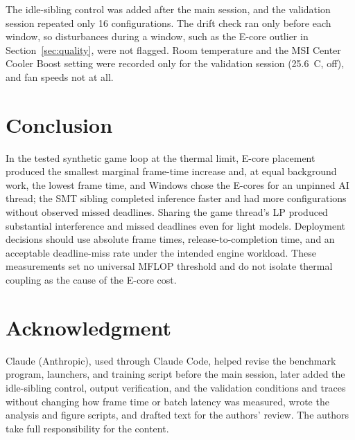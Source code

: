 \documentclass[conference]{IEEEtran}
\begin{document}
The idle-sibling control was added after the main session, and the validation session repeated only 16 configurations. The drift check ran only before each window, so disturbances during a window, such as the E-core outlier in Section~\ref{sec:quality}, were not flagged. Room temperature and the MSI Center Cooler Boost setting were recorded only for the validation session (25.6~\textdegree C, off), and fan speeds not at all.

\section{Conclusion}
In the tested synthetic game loop at the thermal limit, E-core placement produced the smallest marginal frame-time increase and, at equal background work, the lowest frame time, and Windows chose the E-cores for an unpinned AI thread; the SMT sibling completed inference faster and had more configurations without observed missed deadlines. Sharing the game thread's LP produced substantial interference and missed deadlines even for light models. Deployment decisions should use absolute frame times, release-to-completion time, and an acceptable deadline-miss rate under the intended engine workload. These measurements set no universal MFLOP threshold and do not isolate thermal coupling as the cause of the E-core cost.

\section*{Acknowledgment}
Claude (Anthropic), used through Claude Code, helped revise the benchmark program, launchers, and training script before the main session, later added the idle-sibling control, output verification, and the validation conditions and traces without changing how frame time or batch latency was measured, wrote the analysis and figure scripts, and drafted text for the authors' review. The authors take full responsibility for the content.
\end{document}
